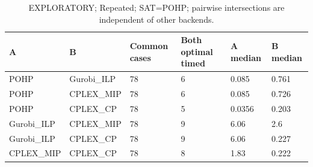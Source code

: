 \begin{table}[htbp]
\centering
\caption{EXPLORATORY; Repeated; SAT=POHP; pairwise intersections are independent of other backends.}
\label{tab:p2b-Repeated-exploratory-pairs}
\begin{tabular}{llllll}
\hline
A & B & Common cases & Both optimal timed & A median & B median \\
\hline
POHP & Gurobi\_ILP & 78 & 6 & 0.085 & 0.761 \\
POHP & CPLEX\_MIP & 78 & 6 & 0.085 & 0.726 \\
POHP & CPLEX\_CP & 78 & 5 & 0.0356 & 0.203 \\
Gurobi\_ILP & CPLEX\_MIP & 78 & 9 & 6.06 & 2.6 \\
Gurobi\_ILP & CPLEX\_CP & 78 & 9 & 6.06 & 0.227 \\
CPLEX\_MIP & CPLEX\_CP & 78 & 8 & 1.83 & 0.222 \\
\hline
\end{tabular}
\end{table}
